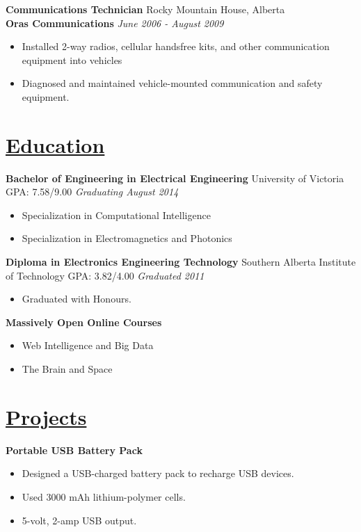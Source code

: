 \documentclass[a4paper, 11pt]{article}
\begin{document}
  \textbf{Communications Technician}
  \hfill
  Rocky Mountain House, Alberta \\
  \textbf{Oras Communications}
  \hfill
  \emph{June 2006 - August 2009}
  \begin{itemize}[nosep]
  \item Installed 2-way radios, cellular handsfree kits, and other communication equipment into vehicles
  \item Diagnosed and maintained vehicle-mounted communication and safety equipment.
  \end{itemize}  

\section{\underline{Education}}
  \textbf{Bachelor of Engineering in Electrical Engineering}
  \hfill
  University of Victoria\\
  GPA: 7.58/9.00
  \hfill
  \emph{Graduating August 2014}
  \begin{itemize}[nosep]
    \item Specialization in Computational Intelligence
    \item Specialization in Electromagnetics and Photonics
  \end{itemize}
  \medskip
  
  \textbf{Diploma in Electronics Engineering Technology}
  \hfill
  Southern Alberta Institute of Technology
  GPA: 3.82/4.00
  \hfill
  \emph{Graduated 2011}
  \begin{itemize}[nosep]
    \item Graduated with Honours.
  \end{itemize}
  \medskip
  
  \textbf{Massively Open Online Courses}
  \begin{itemize}[nosep]
    \item Web Intelligence and Big Data
    \item The Brain and Space
  \end{itemize}
  
\section{\underline{Projects}}
  \textbf{Portable USB Battery Pack}
  \begin{itemize}[nosep]
    \item Designed a USB-charged battery pack to recharge USB devices.
    \item Used 3000 mAh lithium-polymer cells.
    \item 5-volt, 2-amp USB output.
  \end{itemize}
  \medskip
\end{document}
